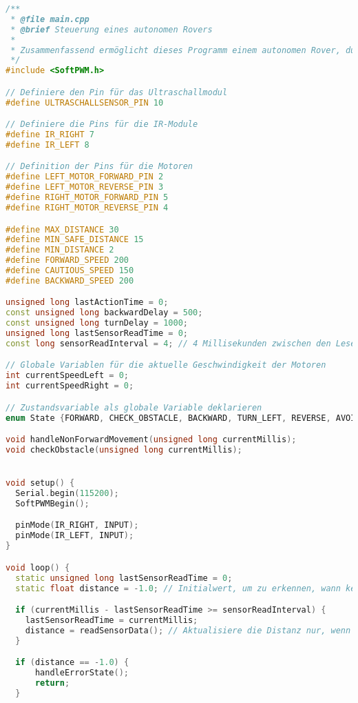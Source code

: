 \documentclass{vorlage-design-main}
\begin{document}
\begin{lstlisting}[language={C++}]
/**
 * @file main.cpp
 * @brief Steuerung eines autonomen Rovers
 * 
 * Zusammenfassend ermöglicht dieses Programm einem autonomen Rover, durch eine Umgebung zu navigieren, indem es kontinuierlich Sensordaten liest, auf diese Daten reagiert und seine Bewegungen entsprechend anpasst, um Hindernissen auszuweichen und bestimmte Ziele zu erreichen.
 */
#include <SoftPWM.h>

// Definiere den Pin für das Ultraschallmodul
#define ULTRASCHALLSENSOR_PIN 10

// Definiere die Pins für die IR-Module
#define IR_RIGHT 7
#define IR_LEFT 8

// Definition der Pins für die Motoren
#define LEFT_MOTOR_FORWARD_PIN 2
#define LEFT_MOTOR_REVERSE_PIN 3
#define RIGHT_MOTOR_FORWARD_PIN 5
#define RIGHT_MOTOR_REVERSE_PIN 4

#define MAX_DISTANCE 30
#define MIN_SAFE_DISTANCE 15
#define MIN_DISTANCE 2
#define FORWARD_SPEED 200
#define CAUTIOUS_SPEED 150
#define BACKWARD_SPEED 200

unsigned long lastActionTime = 0;
const unsigned long backwardDelay = 500;
const unsigned long turnDelay = 1000;
unsigned long lastSensorReadTime = 0;
const long sensorReadInterval = 4; // 4 Millisekunden zwischen den Lesevorgängen

// Globale Variablen für die aktuelle Geschwindigkeit der Motoren
int currentSpeedLeft = 0;
int currentSpeedRight = 0;

// Zustandsvariable als globale Variable deklarieren
enum State {FORWARD, CHECK_OBSTACLE, BACKWARD, TURN_LEFT, REVERSE, AVOID, WAIT, ERROR} state = FORWARD;

void handleNonForwardMovement(unsigned long currentMillis);
void checkObstacle(unsigned long currentMillis);


void setup() {
  Serial.begin(115200);
  SoftPWMBegin();

  pinMode(IR_RIGHT, INPUT);
  pinMode(IR_LEFT, INPUT);
}

void loop() {
  static unsigned long lastSensorReadTime = 0;
  static float distance = -1.0; // Initialwert, um zu erkennen, wann keine Messung vorliegt

  if (currentMillis - lastSensorReadTime >= sensorReadInterval) {
    lastSensorReadTime = currentMillis;
    distance = readSensorData(); // Aktualisiere die Distanz nur, wenn eine neue Messung erfolgt
  }

  if (distance == -1.0) {
      handleErrorState();
      return;
  }


\end{lstlisting}
\end{document}
